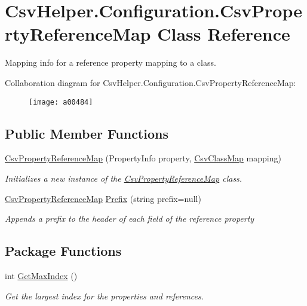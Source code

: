\hypertarget{a00065}{\section{Csv\-Helper.\-Configuration.\-Csv\-Property\-Reference\-Map Class Reference}
\label{a00065}
}


Mapping info for a reference property mapping to a class.  




Collaboration diagram for Csv\-Helper.\-Configuration.\-Csv\-Property\-Reference\-Map\-:
\nopagebreak
\begin{figure}[H]
\begin{center}
\leavevmode
\texttt{[image: a00484]}
\end{center}
\end{figure}
\subsection*{Public Member Functions}
\begin{DoxyCompactItemize}
\item 
\hyperlink{a00065_a02823d2439667bca75233abbe81651ff}{Csv\-Property\-Reference\-Map} (Property\-Info property, \hyperlink{a00050}{Csv\-Class\-Map} mapping)
\begin{DoxyCompactList}\small\item\em Initializes a new instance of the \hyperlink{a00065}{Csv\-Property\-Reference\-Map} class. \end{DoxyCompactList}\item 
\hyperlink{a00065}{Csv\-Property\-Reference\-Map} \hyperlink{a00065_a0ed653de99ec2251fd99837740693789}{Prefix} (string prefix=null)
\begin{DoxyCompactList}\small\item\em Appends a prefix to the header of each field of the reference property \end{DoxyCompactList}\end{DoxyCompactItemize}
\subsection*{Package Functions}
\begin{DoxyCompactItemize}
\item 
int \hyperlink{a00065_a1e879f9a6ed84415ac52c44f1f086606}{Get\-Max\-Index} ()
\begin{DoxyCompactList}\small\item\em Get the largest index for the properties and references. \end{DoxyCompactList}\end{DoxyCompactItemize}
